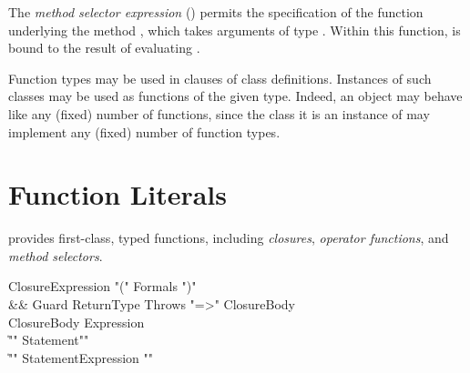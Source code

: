 



The \emph{method selector expression}  ()
permits the specification of the function underlying
the method , which takes arguments of type .
Within this function,  is bound to the result of evaluating .

Function types may be used in  clauses of class
definitions. Instances of such classes may be used as functions of the
given type.  Indeed, an object may behave like any (fixed) number of
functions, since the class it is an instance of may implement any
(fixed) number of function types.

%


\section{Function Literals}
\label{FunctionLiteral}

\Xten{} provides first-class, typed functions, including
\emph{closures}, \emph{operator functions}, and \emph{method
  selectors}.

\begin{grammar}
ClosureExpression \:
        \xcd"("
        Formals\opt
        \xcd")"
\\ &&
        Guard\opt
        ReturnType\opt
        Throws\opt
        \xcd"=>" ClosureBody \\
ClosureBody \:
        Expression \\
        \| \xcd"{" Statement\star \xcd"}" \\
        \| \xcd"{" Statement\star Expression \xcd"}" \\
\end{grammar}

